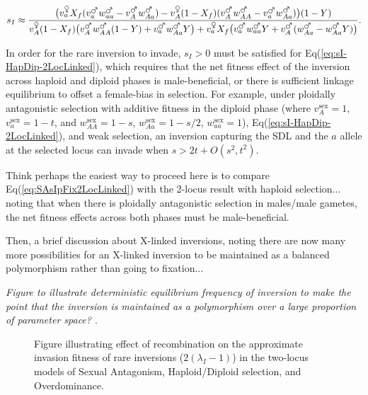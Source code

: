 \documentclass{article}
\newcommand\hl[1]{%
  \bgroup
  \hskip0pt\color{blue!80!black}%
  #1%
  \egroup
}
\begin{document}
\begin{equation}\label{eq:sI-HapDip-2LocLinked}
	s_I \approx \frac{\big( v^{\female}_{a} X_f (v^{\mars}_{a} w^{\mars}_{aa} -v^{\mars}_{A} w^{\mars}_{Aa} ) - v^{\female}_{A} (1 - X_f) (v^{\mars}_{A} w^{\mars}_{AA} - v^{\mars}_{a} w^{\mars}_{Aa}) \big) (1 - Y)} {v^{\female}_{A} (1 - X_f) \big( v^{\mars}_{A} w^{\mars}_{AA} (1 - Y) + v^{\mars}_{a} w^{\mars}_{Aa} Y \big) + v^{\female}_{a} X_f \big( v^{\mars}_{a} w^{\mars}_{aa} Y + v^{\mars}_{A} (w^{\mars}_{Aa} - w^{\mars}_{Aa} Y) \big)}.
\end{equation}

\noindent In order for the rare inversion to invade, $s_I > 0$ must be satisfied for Eq(\ref{eq:sI-HapDip-2LocLinked}), which requires that the net fitness effect of the inversion across haploid and diploid phases is male-beneficial, or there is sufficient linkage equilibrium to offset a female-bias in selection. For example, under ploidally antagonistic selection with additive fitness in the diploid phase (where $v^{\text{sex}}_{A} = 1$, $v^{\text{sex}}_{a} = 1 - t$, and $w^{\text{sex}}_{AA} = 1 - s$, $w^{\text{sex}}_{Aa} = 1 - s/2$, $w^{\text{sex}}_{aa} = 1$), Eq(\ref{eq:sI-HapDip-2LocLinked}), and weak selection, an inversion capturing the SDL and the $a$ allele at the selected locus can invade when $s > 2 t + O(s^2,t^2)$.




\hl{Think perhaps the easiest way to proceed here is to compare Eq(\ref{eq:SAsIpFix2LocLinked}) with the 2-locus result with haploid selection... noting that when there is ploidally antagonistic selection in males/male gametes, the net fitness effects across both phases must be male-beneficial. 

Then, a brief discussion about X-linked inversions, noting there are now many more possibilities for an X-linked inversion to be maintained as a balanced polymorphism rather than going to fixation... } 

{\itshape \hl{ Figure to illustrate deterministic equilibrium frequency of inversion to make the point that the inversion is maintained as a polymorphism over a large proportion of parameter space?}}.



 \begin{figure}[htbp]
 \centering
 \caption{\hl{Figure illustrating effect of recombination on the approximate invasion fitness of rare inversions ($2 (\lambda_I - 1)$) in the two-locus models of Sexual Antagonism, Haploid/Diploid selection, and Overdominance.}}
 \label{fig:invFit2LocusModels}
 \end{figure}
\vspace{1cm}
\end{document}
